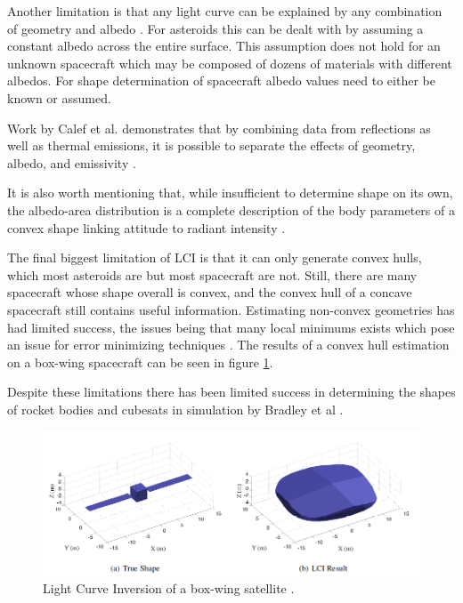 \documentclass{article}
\begin{document}
Another limitation is that any light curve can be explained by any combination of geometry and albedo \cite{Magnusson1989DeterminationOP}. For asteroids this can be dealt with by assuming a constant albedo across the entire surface. This assumption does not hold for an unknown spacecraft which may be composed of dozens of materials with different albedos. For shape determination of spacecraft albedo values need to either be known or assumed. 

Work by Calef et al. demonstrates that by combining data from reflections as well as thermal emissions, it is possible to separate the effects of geometry, albedo, and emissivity \cite{Separating} \cite{PSI}. 

It is also worth mentioning that, while insufficient to determine shape on its own, the albedo-area distribution is a complete description of the body parameters of a convex shape linking attitude to radiant intensity \cite{Separating}.

The final biggest limitation of LCI is that it can only generate convex hulls, which most asteroids are but most spacecraft are not. Still, there are many spacecraft whose shape overall is convex, and the convex hull of a concave spacecraft still contains useful information. Estimating non-convex geometries has had limited success, the issues being that many local minimums exists which pose an issue for error minimizing techniques \cite{Kaasalainen}. The results of a convex hull estimation on a box-wing spacecraft can be seen in figure \ref{shape_im}.

Despite these limitations there has been limited success in determining the shapes of rocket bodies and cubesats in simulation by Bradley et al \cite{Bradley2014LIGHTCURVEIF}.

\begin{figure}[h]
	\centering
	\includegraphics[width=1\textwidth]{lci_LIGHTCURVE_INVERSION}
	\caption{Light Curve Inversion of a box-wing satellite \cite{Bradley2014LIGHTCURVEIF}.}
	\label{shape_im}
\end{figure}
\end{document}
